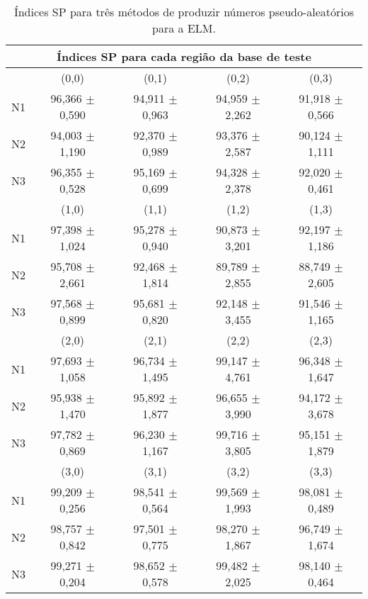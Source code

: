 \begin{apendicesenv}
\begin{table}[H]
	\centering
	\begin{footnotesize}
	\setlength{\extrarowheight}{2pt}
	\caption{Índices SP para três métodos de produzir números pseudo-aleatórios para a ELM.}\label{tab:testELM}
    \begin{tabular}{*{5}{c}}\toprule
    	\multicolumn{5}{c}{Índices SP para cada região da base de teste } \\ \toprule
    	&         (0,0)      &       (0,1)        &         (0,2)      &       (0,3)        \\ \cmidrule(lr){2-2}\cmidrule(lr){3-3}\cmidrule(lr){4-4}\cmidrule(lr){5-5}
	N1	& 96,366 $\pm$ 0,590 & 94,911 $\pm$ 0,963 & 94,959 $\pm$ 2,262 & 91,918 $\pm$ 0,566 \\
	N2	& 94,003 $\pm$ 1,190 & 92,370 $\pm$ 0,989 & 93,376 $\pm$ 2,587 & 90,124 $\pm$ 1,111 \\
    N3  & 96,355 $\pm$ 0,528 & 95,169 $\pm$ 0,699 & 94,328 $\pm$ 2,378 & 92,020 $\pm$ 0,461 \\ \midrule
    	&         (1,0)      &       (1,1)        &         (1,2)      &       (1,3)        \\	\cmidrule(lr){2-2}\cmidrule(lr){3-3}\cmidrule(lr){4-4}\cmidrule(lr){5-5}
	N1	& 97,398 $\pm$ 1,024 & 95,278 $\pm$ 0,940 & 90,873 $\pm$ 3,201 & 92,197 $\pm$ 1,186 \\
	N2	& 95,708 $\pm$ 2,661 & 92,468 $\pm$ 1,814 & 89,789 $\pm$ 2,855 & 88,749 $\pm$ 2,605 \\
	N3	& 97,568 $\pm$ 0,899 & 95,681 $\pm$ 0,820 & 92,148 $\pm$ 3,455 & 91,546 $\pm$ 1,165 \\ \midrule
    	&         (2,0)      &       (2,1)        &         (2,2)      &       (2,3)        \\ \cmidrule(lr){2-2}\cmidrule(lr){3-3}\cmidrule(lr){4-4}\cmidrule(lr){5-5}
	N1	& 97,693 $\pm$ 1,058 & 96,734 $\pm$ 1,495 & 99,147 $\pm$ 4,761 & 96,348 $\pm$ 1,647 \\
	N2	& 95,938 $\pm$ 1,470 & 95,892 $\pm$ 1,877 & 96,655 $\pm$ 3,990 & 94,172 $\pm$ 3,678 \\
	N3	& 97,782 $\pm$ 0,869 & 96,230 $\pm$ 1,167 & 99,716 $\pm$ 3,805 & 95,151 $\pm$ 1,879 \\ \midrule
    	&         (3,0)      &       (3,1)        &         (3,2)      &       (3,3)        \\ \cmidrule(lr){2-2}\cmidrule(lr){3-3}\cmidrule(lr){4-4}\cmidrule(lr){5-5}
	N1	& 99,209 $\pm$ 0,256 & 98,541 $\pm$ 0,564 & 99,569 $\pm$ 1,993 & 98,081 $\pm$ 0,489 \\
	N2	& 98,757 $\pm$ 0,842 & 97,501 $\pm$ 0,775 & 98,270 $\pm$ 1,867 & 96,749 $\pm$ 1,674 \\
	N3	& 99,271 $\pm$ 0,204 & 98,652 $\pm$ 0,578 & 99,482 $\pm$ 2,025 & 98,140 $\pm$ 0,464 \\ \bottomrule
    \end{tabular}
	\end{footnotesize}
\end{table}


\end{apendicesenv}
